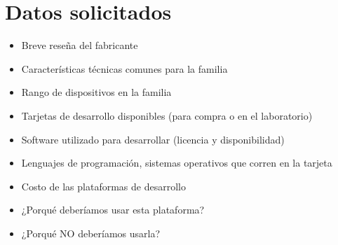 \documentclass[letterpaper,10pt]{article}
\begin{document}
\section{Datos solicitados}
\begin{small}
\begin{itemize}
\item Breve reseña del fabricante
\item Características técnicas comunes para la familia
\item Rango de dispositivos en la familia
\item Tarjetas de desarrollo disponibles (para compra o en el laboratorio)
\item Software utilizado para desarrollar (licencia y disponibilidad)
\item Lenguajes de programación, sistemas operativos que corren en la tarjeta
\item Costo de las plataformas de desarrollo
\item ¿Porqué deberíamos usar esta plataforma?
\item ¿Porqué NO deberíamos usarla?
\end{itemize}
\end{small}
\end{document}
